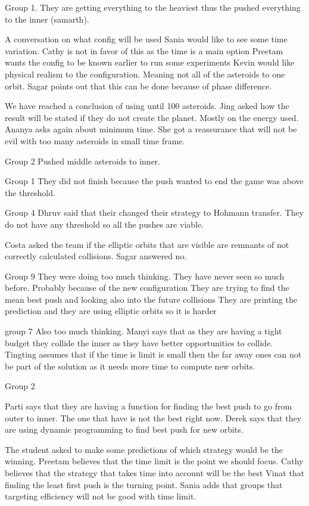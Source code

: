 Group 1.
They are getting everything to the heaviest thus the pushed everything to the inner (samarth).

A conversation on what config will be used
Sania would like to see some time variation.
Cathy is not in favor of this as the time is a main option
Preetam wants the config to be known earlier to run some experiments
Kevin would like physical realism to the configuration. Meaning not all of the asteroids to one orbit.
Sagar points out that this can be done because of phase difference.

We have reached a conclusion of using until 100 asteroids.
Jing asked how the result will be stated if they do not create the planet.
Mostly on the energy used.
Ananya asks again about minimum time.
She got a reassurance that will not be evil with too many asteroids in small time frame.

Group 2
Pushed middle asteroids to inner.

Group 1
They did not finish because the push wanted to end the game was above the threshold.

Group 4
Dhruv said that their changed their strategy to Hohmann transfer. They do not have any threshold so all the pushes are viable.

Costa asked the team if the elliptic orbits that are visible are remnants of not correctly calculated collisions.
Sagar answered no.

Group 9
They were doing too much thinking. They have never seen so much before. Probably because of the new configuration
They are trying to find the mean best push and looking also into the future collisions
They are printing the prediction and they are using elliptic orbits so it is harder

group 7 
Also too much thinking. Manyi says that as they are having a tight budget they collide the inner as they have better opportunities to collide.
Tingting assumes that if the time is limit is small then the far away ones can not be part of the solution as it needs more time to compute new orbits.

Group 2

Parti says that they are having a function for finding the best push to go from outer to inner.
The one that have is not the best right now.
Derek says that they are using dynamic programming to find best push for new orbits.

The student asked to make some predictions of which strategy would be the winning.
Preetam believes that the time limit is the point we should focus.
Cathy believes that the strategy that takes time into account will be the best
Vinat that finding the least first push is the turning point.
Sania adds that groups that targeting efficiency will not be good with time limit.


